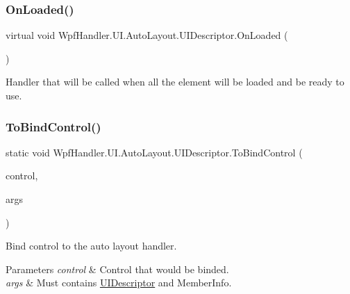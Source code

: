 \subsubsection{\texorpdfstring{On\+Loaded()}{OnLoaded()}}
{\footnotesize\ttfamily virtual void Wpf\+Handler.\+U\+I.\+Auto\+Layout.\+U\+I\+Descriptor.\+On\+Loaded (\begin{DoxyParamCaption}{ }\end{DoxyParamCaption})\hspace{0.3cm}{\ttfamily [virtual]}}



Handler that will be called when all the element will be loaded and be ready to use. 

\mbox{\label{class_wpf_handler_1_1_u_i_1_1_auto_layout_1_1_u_i_descriptor_a129506a55a400487664febab7ea85266}} 
\subsubsection{\texorpdfstring{To\+Bind\+Control()}{ToBindControl()}\hspace{0.1cm}{\footnotesize\ttfamily [1/2]}}
{\footnotesize\ttfamily static void Wpf\+Handler.\+U\+I.\+Auto\+Layout.\+U\+I\+Descriptor.\+To\+Bind\+Control (\begin{DoxyParamCaption}\item[{\mbox{\hyperlink{interface_wpf_handler_1_1_u_i_1_1_auto_layout_1_1_i_g_u_i_field}{I\+G\+U\+I\+Field}}}]{control,  }\item[{params object \mbox{[}$\,$\mbox{]}}]{args }\end{DoxyParamCaption})\hspace{0.3cm}{\ttfamily [static]}}



Bind control to the auto layout handler. 


\begin{DoxyParams}{Parameters}
{\em control} & Control that would be binded.\\
\hline
{\em args} & Must contains \mbox{\hyperlink{class_wpf_handler_1_1_u_i_1_1_auto_layout_1_1_u_i_descriptor}{U\+I\+Descriptor}} and Member\+Info.\\
\hline
\end{DoxyParams}
\mbox{\label{class_wpf_handler_1_1_u_i_1_1_auto_layout_1_1_u_i_descriptor_a763e1f50836b07edf0a3e6579454c335}} 

